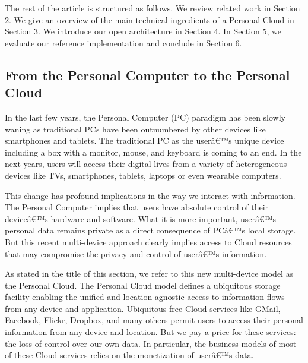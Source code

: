 The rest of the article is structured as follows. We review related work in Section 2. We give an
overview of the main technical ingredients of a Personal Cloud in Section 3. We introduce our 
open architecture in Section 4. In Section 5, we evaluate our reference implementation and conclude
in Section 6.


\subsection{From the Personal Computer to the Personal Cloud}

In the last few years, the Personal Computer (PC) paradigm has been slowly waning as traditional PCs have been outnumbered by other devices like smartphones and tablets. The traditional PC as the userâ€™s unique device including a box with a monitor, mouse, and keyboard is coming to an end.  In the next years, users will access their digital lives from a variety of heterogeneous devices like TVs, smartphones, tablets, laptops or even wearable computers.


This change has profound implications in the way we interact with information. The Personal Computer implies that users have absolute control of their deviceâ€™s hardware and software.  What it is more important, userâ€™s personal data remains private as a direct consequence of  PCâ€™s local storage.  But this recent multi-device approach clearly implies access to Cloud resources that may compromise the privacy and control of userâ€™s  information.


As stated in the title of this section, we refer to this new multi-device model as the Personal Cloud. The Personal Cloud model defines a ubiquitous storage facility enabling the unified and location-agnostic access to information flows from any device and application.  Ubiquitous free Cloud services like GMail, Facebook, Flickr, Dropbox, and many others permit users to access their personal information from any device and location.  But we pay a price for these services: the loss of control over our own data. In particular, the business models of most of these Cloud services relies on the monetization of userâ€™s data.


